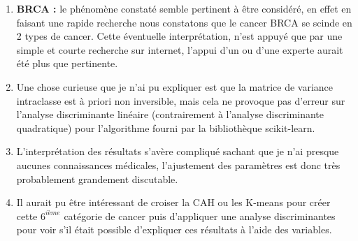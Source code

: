 \documentclass[12pt,a4paper]{article}
\begin{document}
	\begin{enumerate}
		\item \textbf{BRCA :} le phénomène constaté semble pertinent à être considéré, en effet en faisant une rapide recherche nous constatons que le cancer BRCA se scinde en 2 types de cancer. Cette éventuelle interprétation, n'est appuyé que par une simple et courte recherche sur internet, l'appui d'un ou d'une experte aurait été plus que pertinente.
		
		\item Une chose curieuse que je n'ai pu expliquer est que la matrice de variance intraclasse est à priori non inversible, mais cela ne provoque pas d'erreur sur l'analyse discriminante linéaire (contrairement à l'analyse discriminante quadratique) pour l'algorithme fourni par la bibliothèque scikit-learn.
		
		\item L'interprétation des résultats s'avère compliqué sachant que je n'ai presque aucunes connaissances médicales, l'ajustement des paramètres est donc très probablement grandement discutable.
		
		\item Il aurait pu être intéressant de croiser la CAH ou les K-means pour créer cette $6^{ième}$ catégorie de cancer puis d'appliquer une analyse discriminantes pour voir s'il était possible d'expliquer ces résultats à l'aide des variables.
	\end{enumerate}
	
	
	
\end{document}
